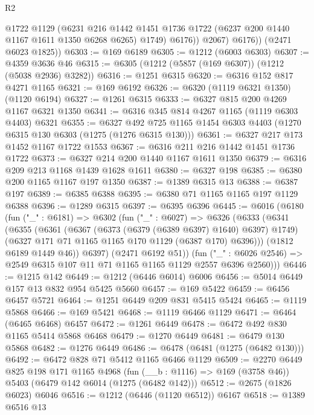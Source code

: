 \begin{lexlean}{R2}
\begin{coremodule}
                @1722
                @1129
                (@6231
                  @216
                  @1442
                  @1451
                  @1736
                  @1722
                  (@6237 @200 @1440 @1167 @1611 @1350 @6268 @6265)
                  @1749)
                @6176))
            @2067)
          @6176))
      (@2471 @6023 @1825))
@6303 := @169 @6189
@6305 := @1212 (@6003 @6303)
@6307 := @4359 @3636 @46
@6315 := @6305 (@1212 (@5857 (@169 @6307)) (@1212 (@5038 @2936) @3282))
@6316 := @1251 @6315
@6320 := @6316 @152 @817 @4271 @1165
@6321 := @169 @6192
@6326 := @6320 (@1119 @6321 @1350) (@1120 @6194)
@6327 := @1261 @6315
@6333 := @6327 @815 @200 @4269 @1167 @6321 @1350
@6341 := @6316 @345 @814 @4267 @1165 (@1119 @6303 @4403) @6321
@6355 := @6327 @492 @725 @1165 @1454 @6303 @4403 (@1270 @6315 @130 @6303 (@1275 (@1276 @6315 @130)))
@6361 := @6327 @217 @173 @1452 @1167 @1722 @1553
@6367 := @6316 @211 @216 @1442 @1451 @1736 @1722
@6373 := @6327 @214 @200 @1440 @1167 @1611 @1350
@6379 := @6316 @209 @213 @1168 @1439 @1628 @1611
@6380 := @6327 @198
@6385 := @6380 @200 @1165 @1167 @197 @1350
@6387 := @1389 @6315 @13
@6388 := @6387 @197
@6389 := @6385 @6388
@6395 := @6380 @71 @1165 @1165 @197 @1129 @6388
@6396 := @1289 @6315
@6397 := @6395 @6396
@6445 := @6016
    (@6180
      (fun ("_" : @6181) =>
      @6302
        (fun ("_" : @6027) =>
        @6326
          (@6333
            (@6341
              (@6355
                (@6361
                  (@6367 (@6373 (@6379 (@6389 @6397) @1640) @6397) @1749)
                  (@6327 @171 @71 @1165 @1165 @170 @1129 (@6387 @170) @6396)))
              (@1812 @6189 @1449 @46))
            @6397)
          (@2471 @6192 @51))
        (fun ("_" : @6026 @2546) => @2549 @6315 @107 @11 @71 @1165 @1165 @1129 @2557 @6396 @2560)))
@6446 := @1215 @142
@6449 := @1212 (@6446 @6014) @6006
@6456 := @5014 @6449 @157 @13 @832 @954 @5425 @5660
@6457 := @169 @5422
@6459 := @6456 @6457 @5721
@6464 := @1251 @6449 @209 @831 @5415 @5424
@6465 := @1119 @5868
@6466 := @169 @5421
@6468 := @1119 @6466 @1129
@6471 := @6464 (@6465 @6468) @6457
@6472 := @1261 @6449
@6478 := @6472 @492 @830 @1165 @5414 @5868 @6468
@6479 := @1270 @6449
@6481 := @6479 @130 @5868
@6482 := @1276 @6449
@6486 := @6478 (@6481 (@1275 (@6482 @130)))
@6492 := @6472 @828 @71 @5412 @1165 @6466 @1129
@6509 := @2270
    @6449
    @825
    @198
    @171
    @1165
    @4968
    (fun (__b : @1116) => @169 (@3758 @46))
    @5403
    (@6479 @142 @6014 (@1275 (@6482 @142)))
@6512 := @2675 (@1826 @6023) @6046
@6516 := @1212 (@6446 (@1120 @6512)) @6167
@6518 := @1389 @6516 @13

\end{coremodule}
\end{lexlean}
